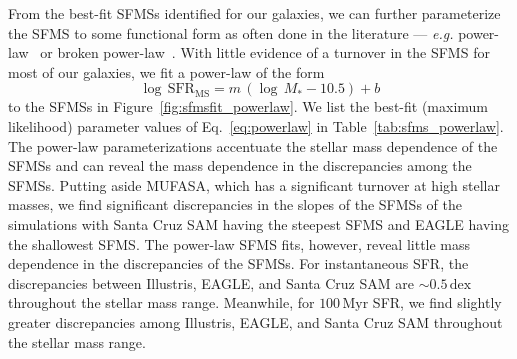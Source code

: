 \documentclass[preprint2,tighten]{aastex62}
\begin{document}
From the best-fit SFMSs identified for our galaxies, we can further 
parameterize the SFMS to some functional form as often done in the 
literature --- \emph{e.g.} power-law~\citep{speagle2014} or broken 
power-law~\citep{lee2015}. With little evidence of a turnover in the 
SFMS for most of our galaxies, we fit a power-law of the form 
\begin{equation} \label{eq:powerlaw}
\log\,\mathrm{SFR}_\mathrm{MS} = m\,(\log\,M_* - 10.5) + b
\end{equation}
to the SFMSs in Figure~\ref{fig:sfmsfit_powerlaw}. We list the best-fit 
(maximum likelihood) parameter values of Eq.~\ref{eq:powerlaw} in 
Table~\ref{tab:sfms_powerlaw}. The power-law parameterizations accentuate 
the stellar mass dependence of the SFMSs and can reveal the mass dependence 
in the discrepancies 
among the SFMSs. Putting aside MUFASA, which has a significant turnover at high 
stellar masses, we find significant discrepancies in the slopes of the SFMSs
of the simulations with Santa Cruz SAM having the steepest SFMS and EAGLE 
having the shallowest SFMS. The power-law SFMS fits, however, reveal little 
mass dependence in the discrepancies of the SFMSs. For instantaneous SFR, 
the discrepancies between Illustris, EAGLE, and Santa Cruz SAM are 
$\sim 0.5\,\mathrm{dex}$ throughout the stellar mass range. Meanwhile, 
for $100\,\mathrm{Myr}$ SFR, we find slightly
greater discrepancies among Illustris, EAGLE, and Santa Cruz SAM throughout
the stellar mass range.
\end{document}

